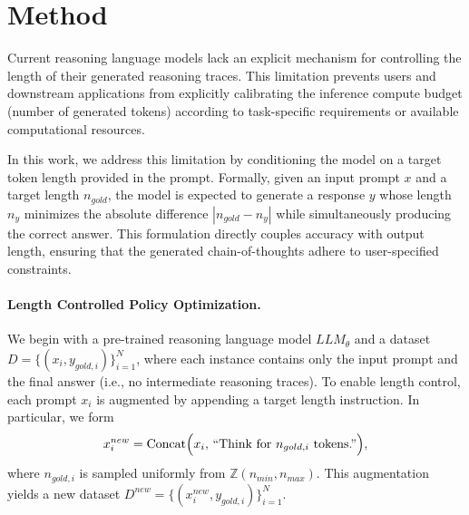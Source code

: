 \section{Method}
\label{sec:method}

Current reasoning language models lack an explicit mechanism for controlling the length of their generated reasoning traces. This limitation prevents users and downstream applications from explicitly calibrating the inference compute budget (number of generated tokens) according to task-specific requirements or available computational resources.

In this work, we address this limitation by conditioning the model on a target token length provided in the prompt. Formally, given an input prompt $x$ and a target length $n_{gold}$, the model is expected to generate a response $y$ whose length $n_y$ minimizes the absolute difference $|n_{gold} - n_y|$ while simultaneously producing the correct answer. This formulation directly couples accuracy with output length, ensuring that the generated chain-of-thoughts adhere to user-specified constraints.


\paragraph{Length Controlled Policy Optimization.}
We begin with a pre-trained reasoning language model $LLM_{\theta}$ and a dataset $D = \{(x_i, y_{gold,i})\}_{i=1}^N$, where each instance contains only the input prompt and the final answer (i.e., no intermediate reasoning traces). To enable length control, each prompt $x_i$ is augmented by appending a target length instruction. In particular, we form
\[
x_i^{new} = \text{Concat}\Bigl(x_i,\, \text{``Think for } n_{gold,i} \text{ tokens.''}\Bigr),
\]
where $n_{gold,i}$ is sampled uniformly from $\mathbb{Z}(n_{min}, n_{max})$. This augmentation yields a new dataset $D^{new} = \{(x_i^{new}, y_{gold,i})\}_{i=1}^N$.

